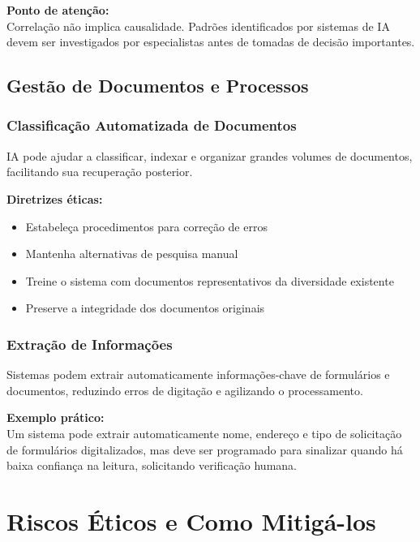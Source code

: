 \documentclass[12pt,a4paper]{article}
\begin{document}
\begin{tcolorbox}[warning]
\textbf{Ponto de atenção:} \\
Correlação não implica causalidade. Padrões identificados por sistemas de IA devem ser investigados por especialistas antes de tomadas de decisão importantes.
\end{tcolorbox}

\subsection{Gestão de Documentos e Processos}

\subsubsection{Classificação Automatizada de Documentos}
IA pode ajudar a classificar, indexar e organizar grandes volumes de documentos, facilitando sua recuperação posterior.

\begin{tcolorbox}[highlight]
\textbf{Diretrizes éticas:}
\begin{itemize}
    \item Estabeleça procedimentos para correção de erros
    \item Mantenha alternativas de pesquisa manual
    \item Treine o sistema com documentos representativos da diversidade existente
    \item Preserve a integridade dos documentos originais
\end{itemize}
\end{tcolorbox}

\subsubsection{Extração de Informações}
Sistemas podem extrair automaticamente informações-chave de formulários e documentos, reduzindo erros de digitação e agilizando o processamento.

\begin{tcolorbox}[example]
\textbf{Exemplo prático:} \\
Um sistema pode extrair automaticamente nome, endereço e tipo de solicitação de formulários digitalizados, mas deve ser programado para sinalizar quando há baixa confiança na leitura, solicitando verificação humana.
\end{tcolorbox}

\newpage
\section{Riscos Éticos e Como Mitigá-los}
\end{document}
